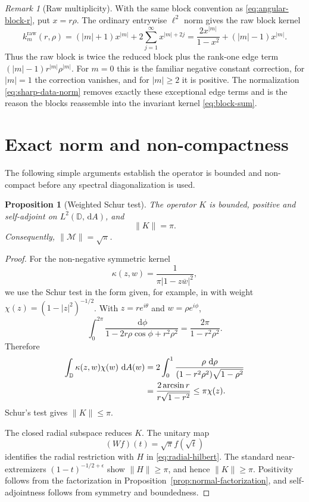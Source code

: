 \IfFileExists{iopjournal.cls}{\documentclass{iopjournal}}{\documentclass{iopjournal-draft}}
\newtheorem{proposition}[theorem]{Proposition}
\theoremstyle{definition}
\theoremstyle{remark}
\newtheorem{remark}[theorem]{Remark}
\newcommand{\D}{\mathbb D}
\newcommand{\dd}{\,\mathrm d}
\newcommand{\norm}[1]{\lVert #1\rVert}
\numberwithin{equation}{section}
\begin{document}
\begin{remark}[Raw multiplicity]
With the same block convention as \eqref{eq:angular-block-r}, put $x=r\rho$.  The ordinary entrywise $\ell^2$ norm gives the raw block kernel
\[
 k_m^{\mathrm{raw}}(r,\rho)
 =(|m|+1)x^{|m|}+2\sum_{j=1}^\infty x^{|m|+2j}
 =\frac{2x^{|m|}}{1-x^2}+(|m|-1)x^{|m|}.
\]
Thus the raw block is twice the reduced block plus the rank-one edge term $(|m|-1)r^{|m|}\rho^{|m|}$.  For $m=0$ this is the familiar negative constant correction, for $|m|=1$ the correction vanishes, and for $|m|\geq2$ it is positive.  The normalization \eqref{eq:sharp-data-norm} removes exactly these exceptional edge terms and is the reason the blocks reassemble into the invariant kernel \eqref{eq:block-sum}.
\end{remark}


\section{Exact norm and non-compactness}
\label{sec:elementary}

The following simple arguments establish the operator is bounded and non-compact before any spectral diagonalization is used.

\begin{proposition}[Weighted Schur test]
\label{prop:norm}
The operator $K$ is bounded, positive and self-adjoint on $L^2(\D,\dd A)$, and
\begin{equation}
 \norm K=\pi.
 \label{eq:exact-norm}
\end{equation}
Consequently, $\norm{\mathcal{M}}=\sqrt\pi$.
\end{proposition}

\begin{proof}
For the non-negative symmetric kernel
\[
 \kappa(z,w)=\frac1{\pi|1-z\overline w|^2},
\]
we use the Schur test  in the form given, for example, in
\cite[Section~4]{HalmosSunder1978} with  weight $\chi(z)=(1-|z|^2)^{-1/2}$.  With $z=re^{i\theta}$ and $w=\rho e^{i\phi}$,
\[
 \int_0^{2\pi}\frac{\dd\phi}
 {1-2r\rho\cos\phi+r^2\rho^2}
 =\frac{2\pi}{1-r^2\rho^2}.
\]
Therefore
\begin{align}
 \int_{\D}\kappa(z,w)\chi(w)\,\dd A(w)
 &=2\int_0^1\frac{\rho\,\dd\rho}
 {(1-r^2\rho^2)\sqrt{1-\rho^2}}\notag\\
 &=\frac{2\arcsin r}{r\sqrt{1-r^2}}
 \leq \pi\chi(z).
 \label{eq:schur-calculation}
\end{align}
Schur's test gives $\norm K\leq\pi$.

The closed radial subspace reduces $K$.  The unitary map
\[
 (Wf)(t)=\sqrt\pi f(\sqrt t)
\]
identifies the radial restriction with $H$ in \eqref{eq:radial-hilbert}.  The standard near-extremizers $(1-t)^{-1/2+\epsilon}$ show $\norm H\geq\pi$, and hence $\norm K\geq\pi$.  Positivity follows from the factorization in Proposition~\ref{prop:normal-factorization}, and self-adjointness follows from symmetry and boundedness.
\end{proof}
\end{document}
